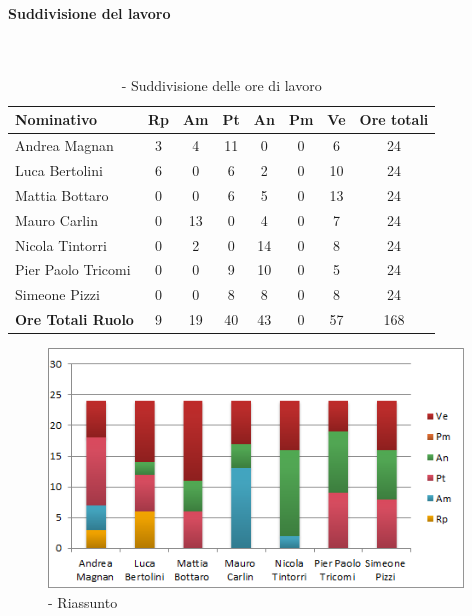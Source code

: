\documentclass[./PianoDiProgetto.tex]{subfiles}
\begin{document}
	\subsubsection{\PerPD}
				\paragraph{Suddivisione del lavoro}\
					
	
	\begin{table}[H]
	
		\begin{tabularx}{\textwidth}{l  * {6}{c}  c}
			\toprule
			\textbf{Nominativo} & \textbf{Rp} & \textbf{Am} & \textbf{Pt} 
						& \textbf{An} & \textbf{Pm} & \textbf{Ve} & \textbf{Ore totali} \\
			\midrule
			Andrea Magnan  & 3 & 4 & 11 & 0 & 0 & 6 & 24 \\
			Luca Bertolini  & 6 & 0 & 6 & 2 & 0 & 10 & 24 \\
			Mattia Bottaro  & 0 & 0 & 6 & 5 & 0 & 13 & 24 \\
			Mauro Carlin  & 0 & 13 & 0 & 4 & 0 & 7 & 24 \\
			Nicola Tintorri  & 0 & 2 & 0 & 14 & 0 & 8 & 24 \\
			Pier Paolo Tricomi  & 0 & 0 & 9 & 10 & 0 & 5 & 24 \\
			Simeone Pizzi & 0 & 0 & 8 & 8 & 0 & 8 & 24 \\
			\midrule			
			\textbf{Ore Totali Ruolo}& 9 & 19 & 40 & 43 & 0 & 57 & 168 \\
			\bottomrule	
		\end{tabularx}
		\caption{\PerPD{} - Suddivisione delle ore di lavoro}
		
	\end{table}
\vfill
\newpage
\vfill	
		
	\begin{figure}[H]
		\centering
		\includegraphics[width=11cm, trim=1cm 0cm 1cm 0cm]{grafici/PD-persona}
			\caption{\PerPD{} - Riassunto}
		
	\end{figure}
\vfill	
\end{document}
